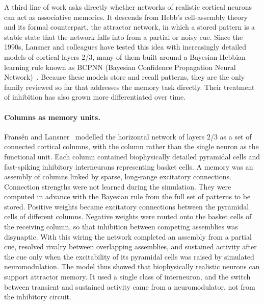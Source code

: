 A third line of work asks directly whether networks of realistic cortical
neurons can act as associative memories. It descends from Hebb's cell-assembly
theory and its formal counterpart, the attractor network, in which a stored
pattern is a stable state that the network falls into from a partial or noisy
cue. Since the 1990s, Lansner and colleagues have tested this idea with
increasingly detailed models of cortical layers 2/3, many of them built around a
Bayesian-Hebbian learning rule known as BCPNN (Bayesian Confidence Propagation
Neural Network)~\cite{lansner2009associative}. Because these models store and
recall patterns, they are the only family reviewed so far that addresses the
memory task directly. Their treatment of inhibition has also grown more
differentiated over time.

\paragraph{Columns as memory units.}
Fransén and Lansner~\cite{fransen1998horizontal} modelled the horizontal network
of layers 2/3 as a set of connected cortical columns, with the column rather than
the single neuron as the functional unit. Each column contained biophysically
detailed pyramidal cells and fast-spiking inhibitory interneurons representing
basket cells. A memory was an assembly of columns linked by sparse, long-range
excitatory connections. Connection strengths were not learned during the
simulation. They were computed in advance with the Bayesian rule from the full
set of patterns to be stored. Positive weights became excitatory connections
between the pyramidal cells of different columns. Negative weights were routed
onto the basket cells of the receiving column, so that inhibition between
competing assemblies was disynaptic. With this wiring the network completed an
assembly from a partial cue, resolved rivalry between overlapping assemblies,
and sustained activity after the cue only when the excitability of its pyramidal
cells was raised by simulated neuromodulation. The model thus showed that
biophysically realistic neurons can support attractor memory. It used a single
class of interneuron, and the switch between transient and sustained activity
came from a neuromodulator, not from the inhibitory circuit.

